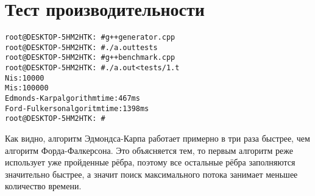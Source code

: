 \section{Тест производительности}

\begin{alltt}
root@DESKTOP-5HM2HTK:~# g++ generator.cpp
root@DESKTOP-5HM2HTK:~# ./a.out tests
root@DESKTOP-5HM2HTK:~# g++ benchmark.cpp
root@DESKTOP-5HM2HTK:~# ./a.out <tests/1.t
N is: 10000
M is: 100000
Edmonds-Karp algorithm time: 467ms
Ford-Fulkerson algoritm time: 1398ms
root@DESKTOP-5HM2HTK:~#
\end{alltt}

Как видно, алгоритм Эдмондса-Карпа работает примерно в три раза быстрее, чем алгоритм Форда-Фалкерсона. Это объясняется тем, то первым алгоритм реже использует уже пройденные рёбра, поэтому все остальные рёбра заполняются значительно быстрее, а значит поиск максимального потока занимает меньшее количество времени.

\pagebreak

